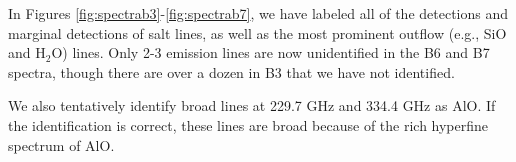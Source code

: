 \documentclass[twocolumn]{aastex62}
\begin{document}
In Figures \ref{fig:spectrab3}-\ref{fig:spectrab7}, we have labeled all of the
detections and marginal detections of salt lines, as well as the most prominent
outflow (e.g., SiO and H$_2$O) lines.  Only 2-3 emission lines are now
unidentified in the B6 and B7 spectra, though there are over a dozen in B3 that
we have not identified. 

We also tentatively identify broad lines at 229.7 GHz and 334.4 GHz as AlO.  If
the identification is correct, these lines are broad because of the rich hyperfine
spectrum of AlO.

%
\end{document}
